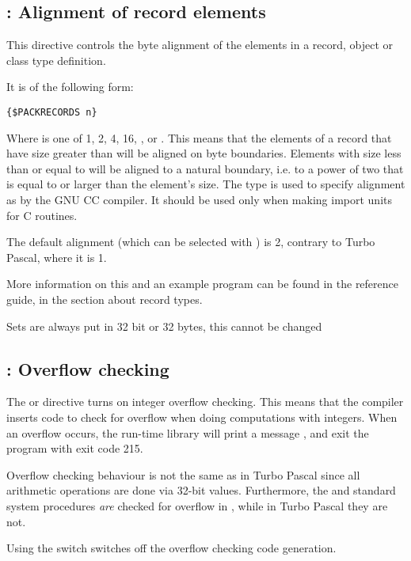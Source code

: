 \subsection{ : Alignment of record elements}

This directive controls the byte alignment of the elements in a record,
object or class type definition.

It is of the following form:
\begin{verbatim}
{$PACKRECORDS n}
\end{verbatim}

Where  is one of 1, 2, 4, 16, ,  or .
This means that the elements of a record that have size greater than 
will be aligned on  byte boundaries. Elements with size less than or
equal to  will be aligned to a natural boundary, i.e. to a power of
two that is equal to or larger than the element's size. The type 
is used to specify alignment as by the GNU CC compiler. It should be used
only when making import units for C routines.

The default alignment (which can be selected with ) is 2,
contrary to Turbo Pascal, where it is 1.

More information on this and an example program can be found in the reference
guide, in the section about record types.

\begin{remark}Sets are always put in 32 bit or 32 bytes, this cannot be changed
\end{remark}

\subsection{ : Overflow checking}
The  or  directive turns on
integer overflow checking. This means that the compiler inserts code
to check for overflow when doing computations with integers.
When an overflow occurs, the run-time library will print a message
, and exit the program with exit code 215.

\begin{remark}Overflow checking behaviour is not the same as in
Turbo Pascal since all arithmetic operations are done via 32-bit
values. Furthermore, the  and  standard system
procedures {\em are} checked for overflow in \fpc, while in Turbo
Pascal they are not.
\end{remark}
Using the  switch switches off the overflow checking code
generation.

